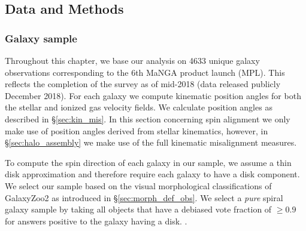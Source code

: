 \subsection{Data and Methods}

\subsubsection{Galaxy sample}
Throughout this chapter, we base our analysis on 4633 unique galaxy observations corresponding to the 6th MaNGA product launch (MPL). This reflects the completion of the survey as of mid-2018 (data released publicly December 2018). For each galaxy we compute kinematic position angles for both the stellar and ionized gas velocity fields. We calculate position angles as described in \S\ref{sec:kin_mis}. In this section concerning spin alignment we only make use of position angles derived from stellar kinematics, however, in \S\ref{sec:halo_assembly} we make use of the full kinematic misalignment measures. 

To compute the spin direction of each galaxy in our sample, we assume a thin disk approximation and therefore require each galaxy to have a disk component. We select our sample based on the visual morphological classifications of GalaxyZoo2 \citep[GZ2][]{willett2013} as introduced in \S\ref{sec:morph_def_obs}. We select a \textit{pure} spiral galaxy sample by taking all objects that have a debiased vote fraction of $\geq 0.9$ for answers positive to the galaxy having a disk. .

